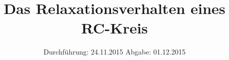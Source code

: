 

\subject{VERSUCH NUMMER 353}
\title{Das Relaxationsverhalten eines RC-Kreis}
\date{
  Durchführung: 24.11.2015
  \hspace{3em}
  Abgabe: 01.12.2015}



\maketitle
\thispagestyle{empty}
\tableofcontents
\newpage







\printbibliography


